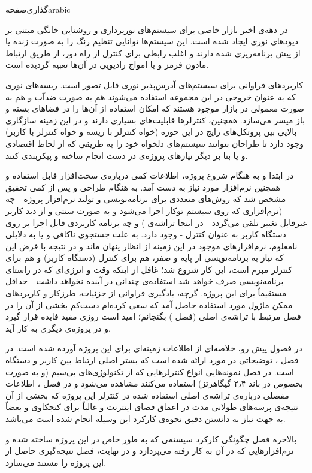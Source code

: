 ‌گذاری‌صفحه{arabic}‬


در دهه‌ی اخیر بازار خاصی برای سیستم‌های نورپردازی و روشنایی خانگی مبتنی بر دیودهای نوری ایجاد شده است. این سیستم‌ها توانایی تنظیم رنگ را به صورت زنده یا از پیش برنامه‌ریزی شده دارند و اغلب رابطی برای کنترل از راه دور، از طریق ارتباط مادون قرمز و یا امواج رادیویی در آن‌ها تعبیه گردیده است.

کاربردهای فراوانی برای سیستم‌های آدرس‌پذیر نوری قابل تصور است. ریسه‌های نوری که به عنوان خروجی در این مجموعه استفاده می‌شوند هم به صورت ضدآب و هم به صورت معمولی در بازار موجود هستند که امکان استفاده از آن‌ها را در فضاهای بسته و باز میسر می‌سازد. همچنین، کنترلرها قابلیت‌های بسیاری دارند و در این زمینه سازگاری بالایی بین پروتکل‌های رایج در این حوزه (خواه کنترلر با ریسه و خواه کنترلر با کاربر) وجود دارد تا طراحان بتوانند سیستم‌های دلخواه خود را به طریقی که از لحاظ اقتصادی و یا بنا بر دیگر نیازهای پروژه‌ی در دست انجام ساخته و پیکربندی کنند.

در ابتدا و به هنگام شروع پروژه، اطلاعات کمی درباره‌ی سخت‌افزار قابل استفاده و همچنین نرم‌افزار مورد نیاز به دست آمد. به هنگام طراحی و پس از کمی تحقیق مشخص شد که روش‌های متعددی برای برنامه‌نویسی و تولید نرم‌افزار پروژه - چه  (نرم‌افزاری که روی سیستم توکار اجرا می‌شود و به صورت سنتی و از دید کاربر غیرقابل تغییر تلقی می‌گردد - در اینجا تراشه‌ی ) و چه برنامه کاربردی قابل اجرا بر روی دستگاه کاربر به عنوان کنترل - وجود دارد. به علت جستجوی ناکافی و یا به دلایلی نامعلوم، نرم‌افزارهای موجود در این زمینه از انظار پنهان ماند و در نتیجه با فرض این که نیاز به برنامه‌نویسی از پایه و صفر، هم برای کنترل (دستگاه کاربر) و هم برای کنترلر مبرم است، این کار شروع شد؛ غافل از اینکه وقت و انرژی‌ای که در راستای برنامه‌نویسی صرف خواهد شد استفاده‌ی چندانی در آینده نخواهد داشت - حداقل مستقیماً برای این پروژه. گرچه، یادگیری فراوانی از جزئیات، طرزکار و کاربردهای ممکن ماژول مورد استفاده حاصل آمد که سعی کرده‌ام دست‌کم بخشی از آن را در فصل مرتبط با تراشه‌ی اصلی (فصل ) بگنجانم؛ امید است روزی مفید فایده قرار گیرد و در پروژه‌ی دیگری به کار آید.

در فصول پیش رو، خلاصه‌ای از اطلاعات زمینه‌ای برای این پروژه آورده شده است. در فصل ، توضیحاتی در مورد  ارائه شده است که بستر اصلی ارتباط بین کاربر و دستگاه است. در فصل  نمونه‌هایی انواع کنترلرهایی که از تکنولوژی‌های بی‌سیم (و به صورت بخصوص در باند ۲٫۴ گیگاهرتز) استفاده می‌کنند مشاهده می‌شود و در فصل ، اطلاعات مفصلی درباره‌ی تراشه‌ی اصلی استفاده شده در کنترلر این پروژه که بخشی از آن نتیجه‌ی پرسه‌های طولانی مدت در اعماق فضای اینترنت و غالباً برای کنجکاوی و بعضاً به جهت نیاز به دانستن دقیق نحوه‌ی کارکرد این وسیله انجام شده است می‌باشد.

بالاخره فصل  چگونگی کارکرد سیستمی که به طور خاص در این پروژه ساخته شده و نرم‌افزارهایی که در آن به کار رفته می‌پردازد و در نهایت، فصل  نتیجه‌گیری حاصل از این پروژه را مستند می‌سازد.

